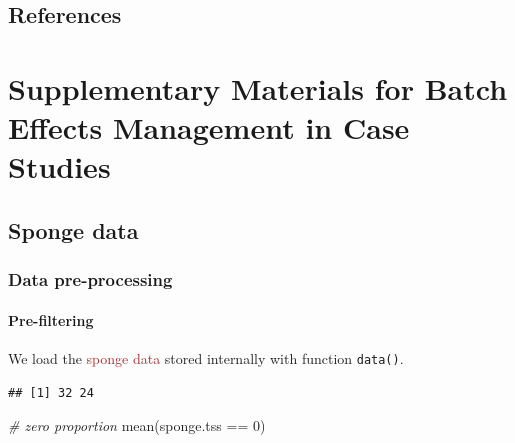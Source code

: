 \documentclass[
]{book}
\newenvironment{Shaded}{\begin{snugshade}}{\end{snugshade}}
\newcommand{\CommentTok}[1]{\textcolor[rgb]{0.56,0.35,0.01}{\textit{#1}}}
\newcommand{\DecValTok}[1]{\textcolor[rgb]{0.00,0.00,0.81}{#1}}
\newcommand{\FunctionTok}[1]{\textcolor[rgb]{0.00,0.00,0.00}{#1}}
\newcommand{\NormalTok}[1]{#1}
\newcommand{\OtherTok}[1]{\textcolor[rgb]{0.56,0.35,0.01}{#1}}
\newcommand{\SpecialCharTok}[1]{\textcolor[rgb]{0.00,0.00,0.00}{#1}}
\newcommand{\StringTok}[1]{\textcolor[rgb]{0.31,0.60,0.02}{#1}}
\begin{document}
\hypertarget{references}{%
\section{References}\label{references}}

\hypertarget{supplementary-materials-for-batch-effects-management-in-case-studies}{%
\chapter{Supplementary Materials for Batch Effects Management in Case Studies}\label{supplementary-materials-for-batch-effects-management-in-case-studies}}

\hypertarget{sponge-data}{%
\section{Sponge data}\label{sponge-data}}

\hypertarget{data-pre-processing-1}{%
\subsection{Data pre-processing}\label{data-pre-processing-1}}

\hypertarget{pre-filtering-1}{%
\subsubsection{Pre-filtering}\label{pre-filtering-1}}

We load the \textcolor{brown}{sponge data} stored internally with function \texttt{data()}.

\begin{Shaded}
\end{Shaded}

\begin{verbatim}
## [1] 32 24
\end{verbatim}

\begin{Shaded}
\begin{Highlighting}[]
\CommentTok{\# zero proportion}
\FunctionTok{mean}\NormalTok{(sponge.tss }\SpecialCharTok{==} \DecValTok{0}\NormalTok{)}
\end{Highlighting}
\end{Shaded}
\end{document}
